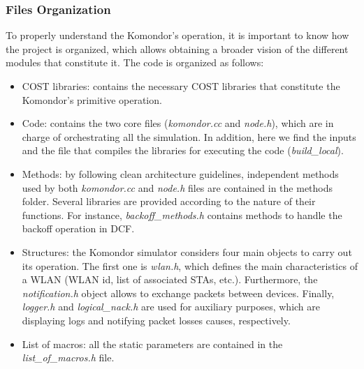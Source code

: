 \documentclass[a4paper]{article}
\begin{document}
		\subsubsection{Files Organization}
		\label{section:files}		
		To properly understand the Komondor's operation, it is important to know how the project is organized, which allows obtaining a broader vision of the different modules that constitute it. The code is organized as follows:
		\begin{itemize}
			\item COST libraries: contains the necessary COST libraries that constitute the Komondor's primitive operation. 
			\item Code: contains the two core files (\emph{komondor.cc} and \emph{node.h}), which are in charge of orchestrating all the simulation. In addition, here we find the inputs and the file that compiles the libraries for executing the code (\emph{build\_local}).
			\item Methods: by following clean architecture guidelines, independent methods used by both \emph{komondor.cc} and \emph{node.h} files are contained in the methods folder. Several libraries are provided according to the nature of their functions. For instance, \emph{backoff\_methods.h} contains methods to handle the backoff operation in DCF.
			\item Structures: the Komondor simulator considers four main objects to carry out its operation. The first one is \emph{wlan.h}, which defines the main characteristics of a WLAN (WLAN id, list of associated STAs, etc.). Furthermore, the \emph{notification.h} object allows to exchange packets between devices. Finally, \emph{logger.h} and \emph{logical\_nack.h} are used for auxiliary purposes, which are displaying logs and notifying packet losses causes, respectively.
			\item List of macros: all the static parameters are contained in the \emph{list\_of\_macros.h} file. 			
		\end{itemize}
		
\end{document}
